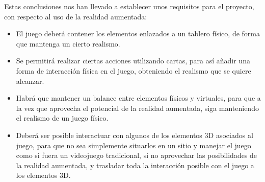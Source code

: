 Estas conclusiones nos han llevado a establecer unos requisitos para el proyecto, con respecto al uso de la realidad aumentada:

\begin{itemize}
  \item El juego deberá contener los elementos enlazados a un tablero físico, de forma que mantenga un cierto realismo.

  \item Se permitirá realizar ciertas acciones utilizando cartas, para así añadir una forma de interacción física en el juego, obteniendo el realismo que se quiere alcanzar.

  \item Habrá que mantener un balance entre elementos físicos y virtuales, para que a la vez que aprovecha el potencial de la realidad aumentada, siga manteniendo el realismo de un juego físico.

  \item Deberá ser posible interactuar con algunos de los elementos 3D asociados al juego, para que no sea simplemente situarlos en un sitio y manejar el juego como si fuera un videojuego tradicional, si no aprovechar las posibilidades de la realidad aumentada, y trasladar toda la interacción posible con el juego a los elementos 3D.

\end{itemize}
